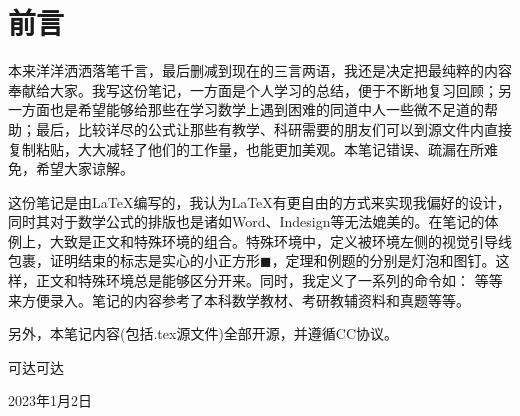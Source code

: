 \section{前言}
本来洋洋洒洒落笔千言，最后删减到现在的三言两语，我还是决定把最纯粹的内容奉献给大家。我写这份笔记，一方面是个人学习的总结，便于不断地复习回顾；另一方面也是希望能够给那些在学习数学上遇到困难的同道中人一些微不足道的帮助；最后，比较详尽的公式让那些有教学、科研需要的朋友们可以到源文件内直接复制粘贴，大大减轻了他们的工作量，也能更加美观。本笔记错误、疏漏在所难免，希望大家谅解。

这份笔记是由\LaTeX{}编写的，我认为\LaTeX{}有更自由的方式来实现我偏好的设计，同时其对于数学公式的排版也是诸如Word、Indesign等无法媲美的。在笔记的体例上，大致是正文和特殊环境的组合。特殊环境中，定义被环境左侧的视觉引导线包裹，证明结束的标志是实心的小正方形$\blacksquare $，定理和例题的分别是灯泡和图钉。这样，正文和特殊环境总是能够区分开来。同时，我定义了一系列的命令如：\jie \zheng {} 等等来方便录入。笔记的内容参考了本科数学教材、考研教辅资料和真题等等。

另外，本笔记内容(包括.tex源文件)全部开源，并遵循CC协议。

\hfill 可达可达

\hfill 2023年1月2日